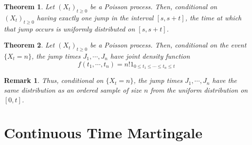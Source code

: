 \documentclass{article}
\newtheorem{Thm}{Theorem}[section]
\newtheorem*{Rk}{Remark}
\theoremstyle{definition}
\begin{document}
\begin{Thm}
    Let $(X_t)_{t\ge 0}$ be a Poisson process. Then, conditional on $(X_t)_{t\ge 0}$ having exactly one jump in the interval $[s, s +t]$, the time at which that jump occurs is uniformly distributed on $[s, s + t]$.
\end{Thm}
\begin{Thm}
    Let $(X_t)_{t\ge 0}$ be a Poisson process. Then, conditional on the event $\{X_t = n\}$, the jump times $J_1, \cdots ,J_n$ have joint density function
\[f(t_1,\cdots ,t_n)=n!1_{0\le t_1\le \cdots \le t_n\le t}\]
\end{Thm}
\begin{Rk}
    Thus, conditional on $\{X_t = n\}$, the jump times $J_1, \cdots ,J_n$ have the same distribution as an ordered sample of size $n$ from the uniform distribution on $[0,t]$.
\end{Rk}

\section{Continuous Time Martingale}
\end{document}
